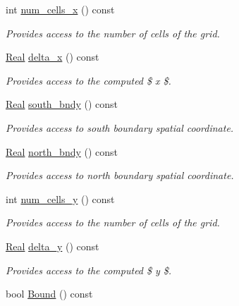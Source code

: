 \begin{DoxyCompactItemize}
int \hyperlink{classmtk_1_1UniStgGrid2D_a2d182866a398aba8e4829590e85bf939}{num\+\_\+cells\+\_\+x} () const 
\begin{DoxyCompactList}\small\item\em Provides access to the number of cells of the grid. \end{DoxyCompactList}\item 
\hyperlink{group__c01-roots_gac080bbbf5cbb5502c9f00405f894857d}{Real} \hyperlink{classmtk_1_1UniStgGrid2D_aca4710004c4a7da6a9e8fd6ab32a691f}{delta\+\_\+x} () const 
\begin{DoxyCompactList}\small\item\em Provides access to the computed \$  x \$. \end{DoxyCompactList}\item 
\hyperlink{group__c01-roots_gac080bbbf5cbb5502c9f00405f894857d}{Real} \hyperlink{classmtk_1_1UniStgGrid2D_a1442eaf219f099d0ebf46a170fdebf92}{south\+\_\+bndy} () const 
\begin{DoxyCompactList}\small\item\em Provides access to south boundary spatial coordinate. \end{DoxyCompactList}\item 
\hyperlink{group__c01-roots_gac080bbbf5cbb5502c9f00405f894857d}{Real} \hyperlink{classmtk_1_1UniStgGrid2D_afe1ead253cdeb5503e0489eba8fd84e2}{north\+\_\+bndy} () const 
\begin{DoxyCompactList}\small\item\em Provides access to north boundary spatial coordinate. \end{DoxyCompactList}\item 
int \hyperlink{classmtk_1_1UniStgGrid2D_aed05a801cc9a76dba0ff203cea58a61a}{num\+\_\+cells\+\_\+y} () const 
\begin{DoxyCompactList}\small\item\em Provides access to the number of cells of the grid. \end{DoxyCompactList}\item 
\hyperlink{group__c01-roots_gac080bbbf5cbb5502c9f00405f894857d}{Real} \hyperlink{classmtk_1_1UniStgGrid2D_a65a78cfc80ffdbeb282ed57af4dc5cb4}{delta\+\_\+y} () const 
\begin{DoxyCompactList}\small\item\em Provides access to the computed \$  y \$. \end{DoxyCompactList}\item 
bool \hyperlink{classmtk_1_1UniStgGrid2D_aa651194ccd0321a7c61a8f56fa5e8455}{Bound} () const 

\end{DoxyCompactItemize}
